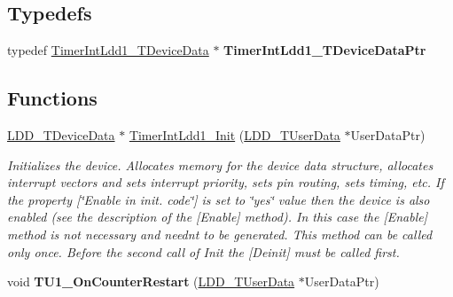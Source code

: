 \subsection*{Typedefs}
\begin{DoxyCompactItemize}
\item 
typedef \hyperlink{struct_timer_int_ldd1___t_device_data}{Timer\+Int\+Ldd1\+\_\+\+T\+Device\+Data} $\ast$ {\bfseries Timer\+Int\+Ldd1\+\_\+\+T\+Device\+Data\+Ptr}\hypertarget{group___timer_int_ldd1__module_ga24d5bad052ceefb0ed97378c80c8dc03}{}\label{group___timer_int_ldd1__module_ga24d5bad052ceefb0ed97378c80c8dc03}

\end{DoxyCompactItemize}
\subsection*{Functions}
\begin{DoxyCompactItemize}
\item 
\hyperlink{group___p_e___types__module_gac5cf1362f1f0e3a2ce71b1bf2276d091}{L\+D\+D\+\_\+\+T\+Device\+Data} $\ast$ \hyperlink{group___timer_int_ldd1__module_ga069f7459fc74e21fb9bcceadbe7cb9cb}{Timer\+Int\+Ldd1\+\_\+\+Init} (\hyperlink{group___p_e___types__module_ga0b66a73f87238a782318aa0be7578e35}{L\+D\+D\+\_\+\+T\+User\+Data} $\ast$User\+Data\+Ptr)
\begin{DoxyCompactList}\small\item\em Initializes the device. Allocates memory for the device data structure, allocates interrupt vectors and sets interrupt priority, sets pin routing, sets timing, etc. If the property \mbox{[}\char`\"{}\+Enable in init. code\char`\"{}\mbox{]} is set to \char`\"{}yes\char`\"{} value then the device is also enabled (see the description of the \mbox{[}Enable\mbox{]} method). In this case the \mbox{[}Enable\mbox{]} method is not necessary and needn\textquotesingle{}t to be generated. This method can be called only once. Before the second call of Init the \mbox{[}Deinit\mbox{]} must be called first. \end{DoxyCompactList}\item 
void {\bfseries T\+U1\+\_\+\+On\+Counter\+Restart} (\hyperlink{group___p_e___types__module_ga0b66a73f87238a782318aa0be7578e35}{L\+D\+D\+\_\+\+T\+User\+Data} $\ast$User\+Data\+Ptr)\hypertarget{group___timer_int_ldd1__module_ga915c714e97fd2a66385fddc37d45352a}{}\label{group___timer_int_ldd1__module_ga915c714e97fd2a66385fddc37d45352a}

\end{DoxyCompactItemize}


